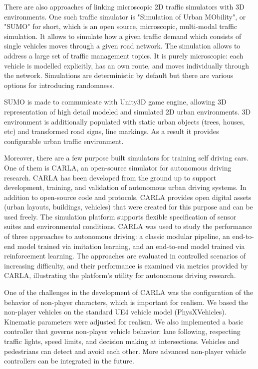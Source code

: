 \documentclass{VUMIFPS-master-intro}
\begin{document}
There are also approaches of linking microscopic 2D traffic simulators with 3D environments. One such traffic simulator is 
"Simulation of Urban MObility", or "SUMO" for short, which is an open source, microscopic, multi-modal traffic simulation. It allows to simulate how a given traffic demand which consists of single vehicles moves through a given road network. The simulation allows to address a large set of traffic management topics. It is purely microscopic: each vehicle is modelled explicitly, has an own route, and moves individually through the network. Simulations are deterministic by default but there are various options for introducing randomness. \cite{Behrisch2011}

SUMO is made to communicate with Unity3D game engine, allowing 3D representation of high detail modeled and simulated 2D urban environments. 3D environment is additionally populated with static urban objects (trees, houses, etc) and transformed road signs, line markings. As a result it provides configurable urban traffic environment. \cite{Biurrun2017}

Moreover, there are a few purpose built simulators for training self driving cars. One of them is CARLA, an open-source simulator for autonomous driving research. CARLA has been developed from the ground up to support development, training, and validation of autonomous urban driving systems. In addition to open-source code and protocols, CARLA provides open digital assets (urban layouts, buildings, vehicles) that were created for this purpose and can be used freely. The simulation platform supports flexible specification of sensor suites and environmental conditions. CARLA was used to study the performance of three approaches to autonomous driving: a classic modular pipeline, an end-to-end model trained via imitation learning, and an end-to-end model trained via reinforcement learning. The approaches are evaluated in controlled scenarios of increasing difficulty, and their performance is examined via metrics provided by CARLA, illustrating the platform’s utility for autonomous driving research. \cite{Dosovitskiy2017}

One of the challenges in the development of CARLA was the configuration of the behavior of non-player characters, which is important for realism. We based the non-player vehicles on the standard UE4 vehicle model (PhysXVehicles). Kinematic parameters were adjusted for realism. We also implemented a basic controller that governs non-player vehicle behavior: lane following, respecting traffic lights, speed limits, and decision making at intersections. Vehicles and pedestrians can detect and avoid each other. More advanced non-player vehicle controllers can be integrated in the future. \cite{Dosovitskiy2017}
\end{document}

